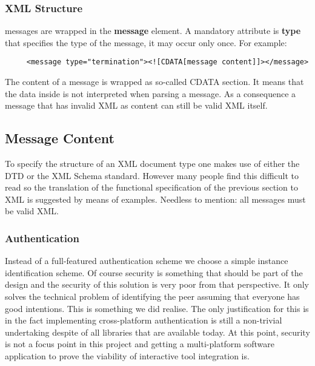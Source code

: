 \documentclass{article}
\begin{document}
   \subsubsection{XML Structure}

    \noindent messages are wrapped in the \textbf{message} element. A mandatory attribute
    is \textbf{type} that specifies the type of the message, it may occur only
    once. For example:
 
    \begin{verbatim}
     <message type="termination"><![CDATA[message content]]></message>\end{verbatim}

    The content of a message is wrapped as so-called CDATA section. It means
    that the data inside is not interpreted when parsing a message. As a
    consequence a message that has invalid XML as content can still be valid
    XML itself.

  \subsection{Message Content}

   To specify the structure of an XML document type one makes use of either the
   DTD or the XML Schema standard. However many people find this difficult to
   read so the translation of the functional specification of the previous
   section to XML is suggested by means of examples. Needless to mention: all
   messages must be valid XML.

  \subsubsection{Authentication}

   Instead of a full-featured authentication scheme we choose a simple instance
   identification scheme. Of course security is something that should be part
   of the design and the security of this solution is very poor from that
   perspective. It only solves the technical problem of identifying the peer
   assuming that everyone has good intentions. This is something we did
   realise. The only justification for this is in the fact implementing
   cross-platform authentication is still a non-trivial undertaking despite of
   all libraries that are available today.  At this point, security is not a
   focus point in this project and getting a multi-platform software
   application to prove the viability of interactive tool integration is.
\end{document}

